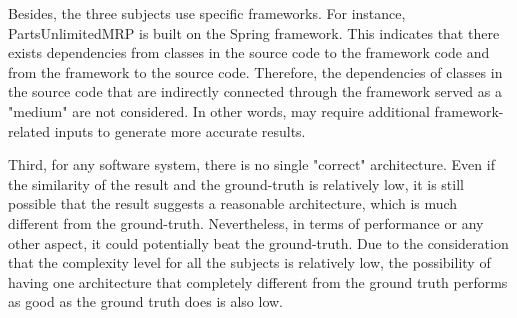 Besides, the three subjects use specific frameworks. For instance, PartsUnlimitedMRP is built on the Spring framework. This indicates that there exists dependencies from classes in the source code to the framework code and from the framework to the source code. Therefore, the dependencies of classes in the source code that are indirectly connected through the framework served as a "medium" are not considered. In other words, \bn may require additional framework-related inputs to generate more accurate results.

Third, for any software system, there is no single "correct" architecture. Even if the similarity of the result and the ground-truth is relatively low, it is still possible that the result suggests a reasonable architecture, which is much different from the ground-truth. Nevertheless, in terms of performance or any other aspect, it could potentially beat the ground-truth. Due to the consideration that the complexity level for all the subjects is relatively low, the possibility of having one architecture that completely different from the ground truth performs as good as the ground truth does is also low. 

